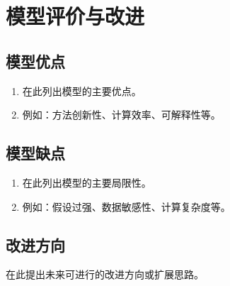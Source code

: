 \section{模型评价与改进}

\subsection{模型优点}

\begin{enumerate}[label=\arabic*.,leftmargin=*]
  \item 在此列出模型的主要优点。
  \item 例如：方法创新性、计算效率、可解释性等。
\end{enumerate}

\subsection{模型缺点}

\begin{enumerate}[label=\arabic*.,leftmargin=*]
  \item 在此列出模型的主要局限性。
  \item 例如：假设过强、数据敏感性、计算复杂度等。
\end{enumerate}

\subsection{改进方向}

在此提出未来可进行的改进方向或扩展思路。
